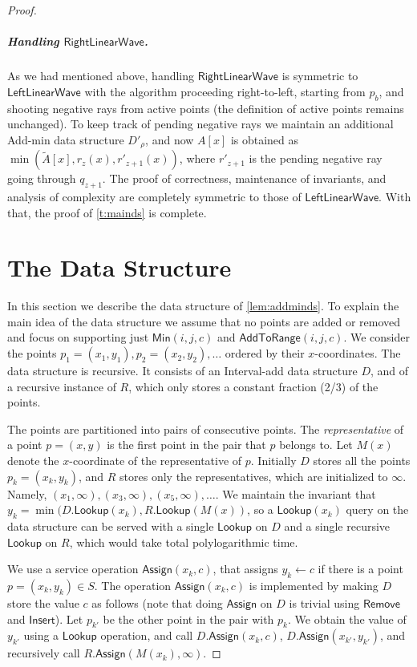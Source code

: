 \documentclass[10pt,a4paper]{article}
\newcommand{\AtR}{\mathsf{AddToRange}}
\newcommand{\LLW}{\mathsf{LeftLinearWave}}
\newcommand{\RLW}{\mathsf{RightLinearWave}}
\newcommand{\assign}{\leftarrow}
\newcommand{\AssignOp}{\mathsf{Assign}}
\newcommand{\local}{\text{short }}
\newcommand{\addmin}{\text{Add-min }}
\newcommand{\Insert}{\mathsf{Insert}}
\newcommand{\Remove}{\mathsf{Remove}}
\newcommand{\Lookup}{\mathsf{Lookup}}
\newcommand{\Min}{\mathsf{Min}}
\newcommand{\TA}{\tilde{A}}
\newcommand{\para}[1]{\vspace{-0.1in} \subparagraph*{#1}}
\newcommand{\ray}{r}
\begin{document}
\begin{proof}
\para{Handling $\RLW$.} As we had mentioned above, handling $\RLW$ is symmetric to $\LLW$ with the algorithm proceeding right-to-left, starting from $p_b$, and shooting negative rays from active points (the definition of active points remains unchanged). To keep track of pending \local negative rays we maintain an additional Add-min data structure $D'_{\rho}$, and now $A[x]$ is obtained as $\min(\TA[x],\ray_z(x),\ray'_{z+1}(x))$, where $\ray'_{z+1}$ is the pending negative ray going through $q_{z+1}$. The proof of correctness, maintenance of invariants, and analysis of complexity are completely symmetric to those of $\LLW$.   
With that, the proof of \cref{t:mainds} is complete.

\section{The \addmin Data Structure}\label{sec:minadd}
In this section we describe the \addmin data structure of \cref{lem:addminds}.
To explain the main idea of the data structure we assume that no points are added or removed and focus on supporting just $\Min(i,j,c)$ and $\AtR(i,j,c)$. 
We consider the points 
$p_1=(x_1,y_1), p_2=(x_2,y_2), \ldots$ ordered by their $x$-coordinates.
The \addmin data structure is recursive. It consists of an Interval-add data structure $D$, and of a recursive instance of \addmin $R$, which only stores a constant fraction (2/3) of the points.

The points are partitioned into pairs of consecutive points. 
The {\em representative} of a point $p=(x,y)$ is the first point in the pair that $p$ belongs to. Let $M(x)$ denote the $x$-coordinate of the representative of $p$. 
Initially $D$ stores all the points $p_k=(x_k,y_k)$, and $R$ stores only the representatives, which are initialized to $\infty$. Namely, $(x_1,\infty), (x_3,\infty), (x_5,\infty), \ldots$.
We maintain the invariant that $y_k = \min(D.\Lookup(x_k), R.\Lookup(M(x))$, so a $\Lookup(x_k)$ query on the data structure can be served with a single $\Lookup$ on $D$ and a single recursive $\Lookup$ on $R$, which would take total polylogarithmic time.

We use a service operation $\AssignOp(x_k,c)$, that assigns $y_k \assign c$ if there is a point $p=(x_k,y_k) \in S$.
The operation $\AssignOp(x_k,c)$ is implemented by making $D$ store the value $c$ as follows (note that doing $\AssignOp$ on $D$ is trivial using $\Remove$ and $\Insert$). Let $p_{k'}$ be the other point in the pair with $p_k$. We obtain the value of $y_{k'}$ using a $\Lookup$ operation, and call $D.\AssignOp(x_{k},c)$, $D.\AssignOp(x_{k'},y_{k'})$, and recursively call $R.\AssignOp(M(x_k),\infty)$. 


\end{proof}
\end{document}
